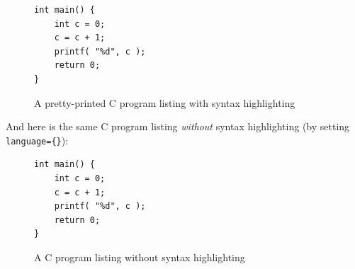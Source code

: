 \begin{figure}[hbt!]
\lstset{basicstyle=\sffamily, language=C, breaklines=true, columns=fullflexible, framesep=10pt, xleftmargin=.4\textwidth, tabsize=4}
\begin{lstlisting}
int main() {
	int c = 0;
	c = c + 1;
	printf( "%d", c );
	return 0;
}
\end{lstlisting}
\caption{A pretty-printed C program listing with syntax highlighting}
\end{figure}


And here is the same C program listing \emph{without} syntax highlighting (by setting \verb|language={}|):

\begin{figure}[hbt!]

\begin{lstlisting}
int main() {
	int c = 0;
	c = c + 1;
	printf( "%d", c );
	return 0;
}
\end{lstlisting}
\caption{A C program listing without syntax highlighting}
\end{figure} 